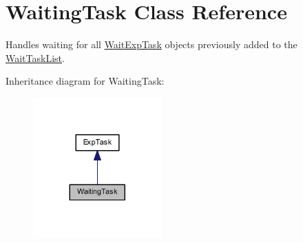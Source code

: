 \hypertarget{class_waiting_task}{}\section{Waiting\+Task Class Reference}
\label{class_waiting_task}


Handles waiting for all \hyperlink{class_wait_exp_task}{Wait\+Exp\+Task} objects previously added to the \hyperlink{class_wait_task_list}{Wait\+Task\+List}.  




Inheritance diagram for Waiting\+Task\+:\nopagebreak
\begin{figure}[H]
\begin{center}
\leavevmode
\includegraphics[width=140pt]{class_waiting_task__inherit__graph}
\end{center}
\end{figure}
